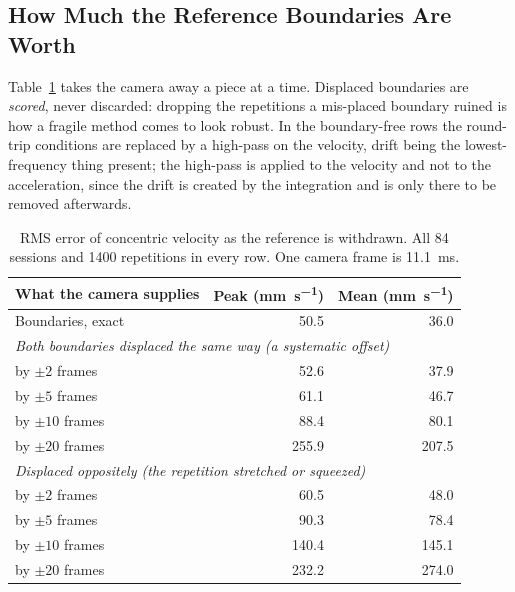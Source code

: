 \subsection{How Much the Reference Boundaries Are Worth}\label{sec:imu_ablation}

Table~\ref{tab:imu_ablation} takes the camera away a piece at a time. Displaced boundaries
are \emph{scored}, never discarded: dropping the repetitions a mis-placed boundary ruined
is how a fragile method comes to look robust. In the boundary-free rows the round-trip
conditions are replaced by a high-pass on the velocity, drift being the lowest-frequency
thing present; the high-pass is applied to the velocity and not to the acceleration, since
the drift is created by the integration and is only there to be removed afterwards.

\begin{table}[t]
  \centering
  \caption{RMS error of concentric velocity as the reference is withdrawn. All \num{84}
           sessions and \num{1400} repetitions in every row. One camera frame is
           \SI{11.1}{\milli\second}.}
  \label{tab:imu_ablation}
  \begin{tabular}{lrr}
    \toprule
    What the camera supplies & Peak (\si{\milli\metre\per\second}) & Mean (\si{\milli\metre\per\second}) \\
    \midrule
    Boundaries, exact                        & 50.5   & 36.0 \\
    \midrule
    \multicolumn{3}{l}{\emph{Both boundaries displaced the same way (a systematic offset)}} \\
    \quad by $\pm 2$ frames                 & 52.6   & 37.9 \\
    \quad by $\pm 5$ frames                 & 61.1   & 46.7 \\
    \quad by $\pm 10$ frames                & 88.4   & 80.1 \\
    \quad by $\pm 20$ frames                & 255.9  & 207.5 \\
    \multicolumn{3}{l}{\emph{Displaced oppositely (the repetition stretched or squeezed)}} \\
    \quad by $\pm 2$ frames                 & 60.5   & 48.0 \\
    \quad by $\pm 5$ frames                 & 90.3   & 78.4 \\
    \quad by $\pm 10$ frames                & 140.4  & 145.1 \\
    \quad by $\pm 20$ frames                & 232.2  & 274.0 \\

\end{tabular}
\end{table}
